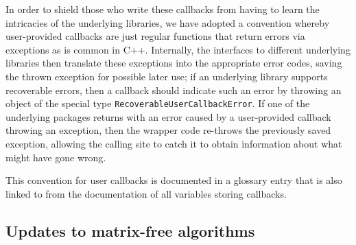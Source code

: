 \documentclass{ansarticle-preprint}
\begin{document}
In order to shield those who write these callbacks from having to
learn the intricacies of the underlying libraries, we have adopted a
convention whereby user-provided callbacks are just regular functions
that return errors via exceptions as is common in C++. Internally, the
interfaces to different underlying libraries then translate these
exceptions into the appropriate error codes, saving the thrown exception for possible
later use; if an underlying library supports
recoverable errors, then a callback should indicate such an error by
throwing an object of the special type
\texttt{RecoverableUserCallbackError}. If one of the underlying
packages returns with an error caused by a user-provided callback
throwing an exception, then the wrapper code re-throws the previously
saved exception, allowing the calling site to catch it to obtain information
about what might have gone wrong.

This convention for user callbacks is documented in a glossary entry
that is also linked to from the documentation of all variables storing
callbacks.


\subsection{Updates to matrix-free algorithms}\label{sec:mf}
\end{document}
